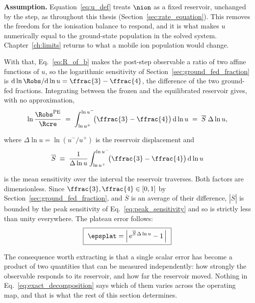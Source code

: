 \textbf{Assumption.} Equation~\eqref{eq:u_def} treats $\nion$ as a fixed
reservoir, unchanged by the step, as throughout this thesis
(Section~\ref{sec:rate_equation}). This removes the freedom for the ionisation
balance to respond, and it is what makes $u$ numerically equal to the
ground-state population in the solved system. Chapter~\ref{ch:limits} returns
to what a mobile ion population would change.

With that, Eq.~\eqref{eq:R_of_b} makes the post-step observable a ratio of two
affine functions of $u$, so the logarithmic sensitivity of
Section~\ref{sec:ground_fed_fraction} is $\mathrm{d}\ln\Robs/\mathrm{d}\ln u =
\ffrac{3}-\ffrac{4}$, the difference of the two ground-fed fractions.
Integrating between the frozen and the equilibrated reservoir gives, with no
approximation,
\begin{equation}
  \ln\frac{\Robs^{\rm PE}}{\Rcre}
  \;=\; \int_{\ln u^+}^{\ln u^-}\!\!\big(\ffrac{3}-\ffrac{4}\big)\,\mathrm{d}\ln u
  \;=\; \overline{S}\;\Delta\ln u ,
  \label{eq:exact_decomposition}
\end{equation}

\noindent where $\Delta\ln u = \ln(u^-/u^+)$ is the reservoir displacement and
\begin{equation}
  \overline{S} \;\equiv\;
  \frac{1}{\Delta\ln u}\int_{\ln u^+}^{\ln u^-}\!\!
  \big(\ffrac{3}-\ffrac{4}\big)\,\mathrm{d}\ln u
  \label{eq:Sbar_def}
\end{equation}

\noindent is the mean sensitivity over the interval the reservoir traverses.
Both factors are dimensionless. Since $\ffrac{3},\ffrac{4}\in[0,1]$ by
Section~\ref{sec:ground_fed_fraction}, and $\overline{S}$ is an average of their
difference, $|\overline{S}|$ is bounded by the peak sensitivity of
Eq.~\eqref{eq:peak_sensitivity} and so is strictly less than unity everywhere.
The plateau error follows:
\begin{equation}
  \boxed{\ \epsplat = \left|\,\mathrm{e}^{\overline{S}\,\Delta\ln u} - 1\,\right|\ }
  \label{eq:eps_plateau_exact}
\end{equation}

The consequence worth extracting is that a single scalar error has become a
product of two quantities that can be measured independently: how strongly the
observable responds to its reservoir, and how far the reservoir moved. Nothing
in Eq.~\eqref{eq:exact_decomposition} says which of them varies across the
operating map, and that is what the rest of this section determines.

